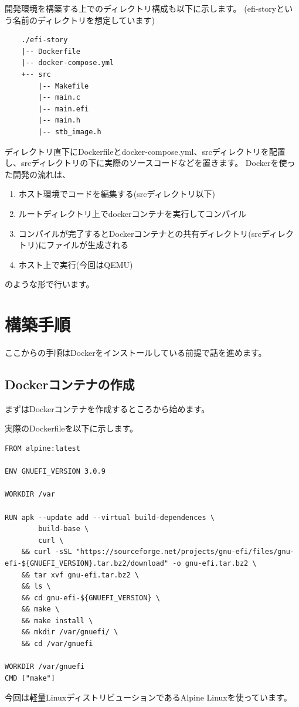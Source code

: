 \documentclass[10pt,b5paper,twoside,openany]{ltjsbook}
\begin{document}
開発環境を構築する上でのディレクトリ構成も以下に示します。
(efi-storyという名前のディレクトリを想定しています)
{
    \centering
    \begin{verbatim}
    ./efi-story
    |-- Dockerfile
    |-- docker-compose.yml
    +-- src
        |-- Makefile
        |-- main.c
        |-- main.efi
        |-- main.h
        |-- stb_image.h
    \end{verbatim}
}
ディレクトリ直下にDockerfileとdocker-compose.yml、srcディレクトリを配置し、srcディレクトリの下に実際のソースコードなどを置きます。
Dockerを使った開発の流れは、
\begin{enumerate}
    \item ホスト環境でコードを編集する(srcディレクトリ以下)
    \item ルートディレクトリ上でdockerコンテナを実行してコンパイル
    \item コンパイルが完了するとDockerコンテナとの共有ディレクトリ(srcディレクトリ)にファイルが生成される
    \item ホスト上で実行(今回はQEMU)
\end{enumerate} 
のような形で行います。

\section{構築手順}
ここからの手順はDockerをインストールしている前提で話を進めます。
\subsection{Dockerコンテナの作成}
まずはDockerコンテナを作成するところから始めます。

実際のDockerfileを以下に示します。
\begin{lstlisting}[style=customBash,caption=dockerfile,label=prog:dockerfile]
FROM alpine:latest

ENV GNUEFI_VERSION 3.0.9

WORKDIR /var

RUN apk --update add --virtual build-dependences \
        build-base \
        curl \
    && curl -sSL "https://sourceforge.net/projects/gnu-efi/files/gnu-efi-${GNUEFI_VERSION}.tar.bz2/download" -o gnu-efi.tar.bz2 \
    && tar xvf gnu-efi.tar.bz2 \
    && ls \
    && cd gnu-efi-${GNUEFI_VERSION} \
    && make \
    && make install \
    && mkdir /var/gnuefi/ \
    && cd /var/gnuefi

WORKDIR /var/gnuefi
CMD ["make"]
\end{lstlisting}
今回は軽量LinuxディストリビューションであるAlpine Linuxを使っています。
\end{document}
